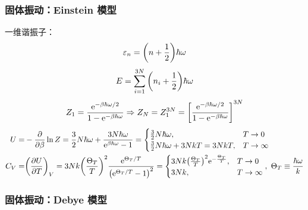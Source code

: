 \subsubsection{固体振动：Einstein 模型}

一维谐振子：\[
    \varepsilon_n = \qty(n + \frac{1}{2}) \hbar \omega
\] \[
    E = \sum_{i = 1}^{3 N} \qty(n_i + \frac{1}{2}) \hbar \omega
\] \[
    Z_1 = \frac{\mathrm{e}^{- \beta \hbar \omega / 2}}{1 - \mathrm{e}^{- \beta \hbar \omega}} \Rightarrow Z_N = Z_1^{3 N} = \qty[\frac{\mathrm{e}^{- \beta \hbar \omega / 2}}{1 - \mathrm{e}^{- \beta \hbar \omega}}]^{3 N}
\] \begin{align*}
    U =   & - \pdv{\beta} \ln{Z} = \frac{3}{2} N \hbar \omega + \frac{3 N \hbar \omega}{\mathrm{e}^{\beta \hbar \omega} - 1} = \begin{cases}
                                                                                                                                   \frac{3}{2} N \hbar \omega,                     & T \to 0      \\
                                                                                                                                   \frac{3}{2} N \hbar \omega + 3 N k T = 3 N k T, & T \to \infty
                                                                                                                               \end{cases}                                  \\
    C_V = & \qty(\pdv{U}{T})_V = 3 N k \qty(\frac{\Theta_T}{T})^2 \frac{\mathrm{e}^{\Theta_T / T}}{\qty(\mathrm{e}^{\Theta_T / T} - 1)^2} = \begin{cases}
                                                                                                                                                3 N k \qty(\frac{\Theta_T}{T})^2 \mathrm{e}^{- \frac{\Theta_T}{T}}, & T \to 0      \\
                                                                                                                                                3 N k,                                                              & T \to \infty
                                                                                                                                            \end{cases} ,\ \Theta_T \equiv \frac{\hbar \omega}{k}
\end{align*}

\subsubsection{固体振动：Debye 模型}

